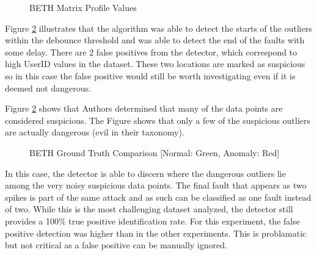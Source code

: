 \begin{figure}[H]
    
    \caption{BETH Matrix Profile Values}
    \label{fig:beth_mp_hist}
\end{figure}

Figure \ref{fig:beth_detection_results} illustrates that the algorithm was able to detect the starts of the outliers within the debounce threshold and was able to detect the end of the faults with some delay. There are 2 false positives from the detector, which correspond to high UserID values in the dataset. These two locations are marked as suspicious so in this case the false positive would still be worth investigating even if it is deemed not dangerous.

Figure \ref{fig:beth_detection_results} shows that Authors \cite{beth-dataset} determined that many of the data points are considered suspicious. The Figure shows that only a few of the suspicious outliers are actually dangerous (evil in their taxonomy). 

\begin{figure}[H]
    
    \caption{BETH Ground Truth Comparison [Normal: Green, Anomaly: Red]}
    \label{fig:beth_detection_results}
\end{figure}

In this case, the detector is able to discern where the dangerous outliers lie among the very noisy suspicious data points.
The final fault that appears as two spikes is part of the same attack and as such can be classified as one fault instead of two.
While this is the most challenging dataset analyzed, the detector still provides a 100\% true positive identification rate.
For this experiment, the false positive detection was higher than in the other experiments.
This is problamatic but not critical as a false positive can be manually ignored.
